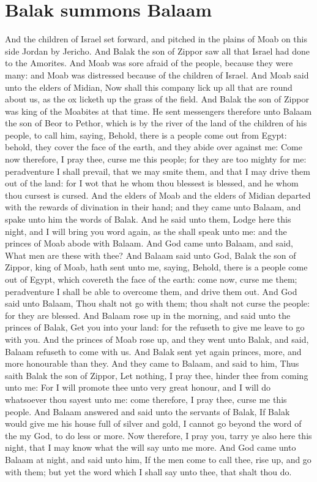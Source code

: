 \section*{Balak summons Balaam}
\begin{biblechapter} %
\verse And the children of Israel set forward, and pitched in the plains of Moab on this side Jordan by Jericho.
\verse And Balak the son of Zippor saw all that Israel had done to the Amorites.
\verse And Moab was sore afraid of the people, because they were many: and Moab was distressed because of the children of Israel.
\verse And Moab said unto the elders of Midian, Now shall this company lick up all that are round about us, as the ox licketh up the grass of the field. And Balak the son of Zippor was king of the Moabites at that time.
\verse He sent messengers therefore unto Balaam the son of Beor to Pethor, which is by the river of the land of the children of his people, to call him, saying, Behold, there is a people come out from Egypt: behold, they cover the face of the earth, and they abide over against me:
\verse Come now therefore, I pray thee, curse me this people; for they are too mighty for me: peradventure I shall prevail, that we may smite them, and that I may drive them out of the land: for I wot that he whom thou blessest is blessed, and he whom thou cursest is cursed.
\verse And the elders of Moab and the elders of Midian departed with the rewards of divination in their hand; and they came unto Balaam, and spake unto him the words of Balak.
\verse And he said unto them, Lodge here this night, and I will bring you word again, as the \LORD shall speak unto me: and the princes of Moab abode with Balaam.
\verse And God came unto Balaam, and said, What men are these with thee?
\verse And Balaam said unto God, Balak the son of Zippor, king of Moab, hath sent unto me, saying,
\verse Behold, there is a people come out of Egypt, which covereth the face of the earth: come now, curse me them; peradventure I shall be able to overcome them, and drive them out.
\verse And God said unto Balaam, Thou shalt not go with them; thou shalt not curse the people: for they are blessed.
\verse And Balaam rose up in the morning, and said unto the princes of Balak, Get you into your land: for the \LORD refuseth to give me leave to go with you.
\verse And the princes of Moab rose up, and they went unto Balak, and said, Balaam refuseth to come with us.
\verse And Balak sent yet again princes, more, and more honourable than they.
\verse And they came to Balaam, and said to him, Thus saith Balak the son of Zippor, Let nothing, I pray thee, hinder thee from coming unto me:
\verse For I will promote thee unto very great honour, and I will do whatsoever thou sayest unto me: come therefore, I pray thee, curse me this people.
\verse And Balaam answered and said unto the servants of Balak, If Balak would give me his house full of silver and gold, I cannot go beyond the word of the \LORD my God, to do less or more.
\verse Now therefore, I pray you, tarry ye also here this night, that I may know what the \LORD will say unto me more.
\verse And God came unto Balaam at night, and said unto him, If the men come to call thee, rise up, and go with them; but yet the word which I shall say unto thee, that shalt thou do.

\end{biblechapter}
